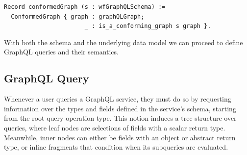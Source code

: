 \begin{verbatim}
Record conformedGraph (s : wfGraphQLSchema) :=
  ConformedGraph { graph : graphQLGraph;
                       _ : is_a_conforming_graph s graph }.
\end{verbatim}


With both the schema and the underlying data model we can proceed to define GraphQL queries and their semantics.

\subsection{GraphQL Query}\label{subsec:query}

Whenever a user queries a GraphQL service, they must do so by requesting information over the types and fields defined in the service's schema, starting from the root query operation type. This notion induces a tree structure over queries, where leaf nodes are selections of fields with a scalar return type. Meanwhile, inner nodes can either be fields with an object or abstract return type, or inline fragments that condition when its subqueries are evaluated. %

